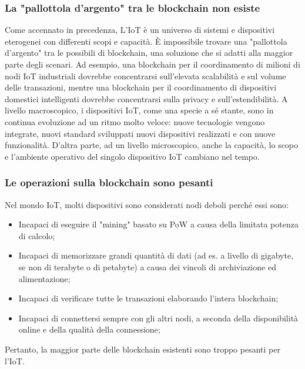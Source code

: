\documentclass[a4paper,12pt,draft]{article}
\begin{document}
\subsubsection{La "pallottola d'argento" tra le blockchain non esiste}
Come accennato in precedenza, L'IoT è un universo di sistemi e dispositivi eterogenei con differenti scopi e capacità. È impossibile trovare una "pallottola d'argento" tra le possibili di blockchain, una soluzione che si adatti alla maggior parte degli scenari. Ad esempio, una blockchain per il coordinamento di milioni di nodi IoT industriali dovrebbe concentrarsi sull'elevata scalabilità e sul volume delle transazioni, mentre una blockchain per il coordinamento di dispositivi domestici intelligenti dovrebbe concentrarsi sulla privacy e sull'estendibilità. A livello macroscopico, i dispositivi IoT, come una specie a sé stante, sono in continua evoluzione ad un ritmo molto veloce: nuove tecnologie vengono integrate, nuovi standard sviluppati nuovi dispositivi realizzati e con nuove funzionalità. D'altra parte, ad un livello microscopico, anche la capacità, lo scopo e l'ambiente operativo del singolo dispositivo IoT cambiano nel tempo.

\subsubsection{Le operazioni sulla blockchain sono pesanti}
Nel mondo IoT, molti dispositivi sono considerati nodi deboli perché essi sono:
\begin{itemize}
	\item
	      Incapaci di eseguire il "mining" basato su PoW a causa della limitata potenza di calcolo;
	\item
	      Incapaci di memorizzare grandi quantità di dati (ad es. a livello di gigabyte, se non di terabyte o di petabyte) a causa dei vincoli di archiviazione ed alimentazione;
	\item
	      Incapaci di verificare tutte le transazioni elaborando l'intera blockchain;
	\item
	      Incapaci di connettersi sempre con gli altri nodi, a seconda della disponibilità online e della qualità della connessione;
\end{itemize}
Pertanto, la maggior parte delle blockchain esistenti sono troppo pesanti per l'IoT.
\end{document}
